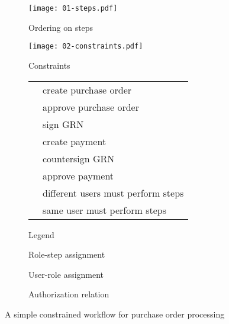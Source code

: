 \documentclass[jcs,crcready]{iosart1c}
\begin{document}
\begin{figure}[h]\centering
\begin{subfigure}[b]{.325\textwidth}\centering
\texttt{[image: 01-steps.pdf]}
\caption{Ordering on steps}\label{subfig:hasse}
\end{subfigure}
\hfill
\begin{subfigure}[b]{.15\textwidth}\centering
\texttt{[image: 02-constraints.pdf]}

\caption{Constraints}\label{subfig:constraints}
\end{subfigure}
\hfill
\begin{subfigure}[b]{.4\textwidth}\centering\small\setlength{\extrarowheight}{1pt}
  \begin{tabular}{|@{}l@{}@{}l@{}|}
    \hline
     & create purchase order \\
     & approve purchase order \\
     & sign GRN \\
     & create payment \\
     & countersign GRN \\
     & approve payment \\
    \hline
     & different users must perform steps \\
     & same user must perform steps \\
    \hline
  \end{tabular}
 \caption{Legend}
\end{subfigure}

\begin{subfigure}[b]{.35\textwidth}\centering\small
 
 \caption{Role-step assignment}\label{subfig:role-step-assignment}
\end{subfigure}
\hfill
\begin{subfigure}[b]{.225\textwidth}\centering\small
 
 \caption{User-role assignment}\label{subfig:user-role-assignment}
\end{subfigure}
\hfill
\begin{subfigure}[b]{.25\textwidth}\small
 
 \caption{Authorization relation}\label{subfig:authorization-relation}
\end{subfigure}
\caption{A simple constrained workflow for purchase order processing}\label{fig:example-workflow}
\end{figure}
\end{document}

